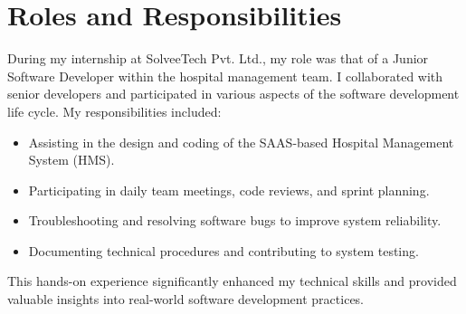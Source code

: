 \section{Roles and Responsibilities}
During my internship at SolveeTech Pvt. Ltd., my role was that of a Junior Software Developer within the hospital management team. I collaborated with senior developers and participated in various aspects of the software development life cycle. My responsibilities included:
\begin{itemize}
  \item Assisting in the design and coding of the SAAS-based Hospital Management System (HMS).
  \item Participating in daily team meetings, code reviews, and sprint planning.
  \item Troubleshooting and resolving software bugs to improve system reliability.
  \item Documenting technical procedures and contributing to system testing.
\end{itemize}
This hands-on experience significantly enhanced my technical skills and provided valuable insights into real-world software development practices.
